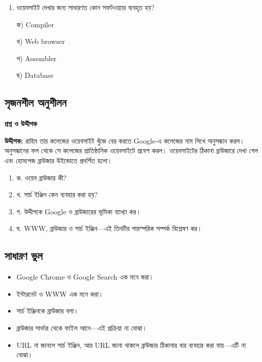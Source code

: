\par\addvspace{4pt}\noindent
\begin{minipage}[t]{.48\linewidth}\vspace{0pt}
\begin{enumerate}[start=5,leftmargin=*,topsep=0pt,itemsep=0pt]
\item ওয়েবসাইট দেখার জন্য সাধারণত কোন সফটওয়্যার ব্যবহৃত হয়?
\par ক) Compiler
\par খ) Web browser
\par গ) Assembler
\par ঘ) Database\\
\end{enumerate}
\end{minipage}
\par


\subsection{সৃজনশীল অনুশীলন}

\noindent
\textbf{\color{chFourRose}প্রশ্ন ও উদ্দীপক}\par
\textbf{উদ্দীপক:} রাহিম তার কলেজের ওয়েবসাইট খুঁজে বের করতে Google-এ কলেজের নাম লিখে অনুসন্ধান করল। অনুসন্ধানের ফল থেকে সে কলেজের প্রাতিষ্ঠানিক ওয়েবসাইটে প্রবেশ করল। ওয়েবসাইটের ঠিকানা ব্রাউজারে দেখা গেল এবং হোমপেজ ব্রাউজার উইন্ডোতে প্রদর্শিত হলো।

\begin{enumerate}
\item ক. ওয়েব ব্রাউজার কী?
\item খ. সার্চ ইঞ্জিন কেন ব্যবহার করা হয়?
\item গ. উদ্দীপকে Google ও ব্রাউজারের ভূমিকা ব্যাখ্যা কর।
\item ঘ. WWW, ব্রাউজার ও সার্চ ইঞ্জিন—এই তিনটির পারস্পরিক সম্পর্ক বিশ্লেষণ কর।
\end{enumerate}
\par\smallskip
\subsection{সাধারণ ভুল}

\begin{itemize}
\item Google Chrome ও Google Search এক মনে করা।
\item ইন্টারনেট ও WWW এক মনে করা।
\item সার্চ ইঞ্জিনকে ব্রাউজার বলা।
\item ব্রাউজার সার্ভার থেকে ফাইল আনে—এই প্রক্রিয়া না বোঝা।
\item URL না জানলে সার্চ ইঞ্জিন, আর URL জানা থাকলে ব্রাউজার ঠিকানার বার ব্যবহার করা যায়—এটি না বোঝা।
\end{itemize}

